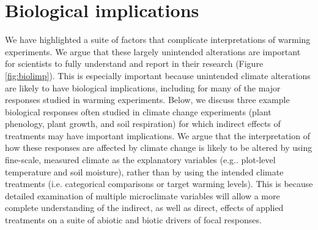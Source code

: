 \documentclass{article}
\begin{document}
\section* {Biological implications}
\par We have highlighted a suite of factors that complicate interpretations of warming experiments. We argue that these largely unintended alterations are important for scientists to fully understand and report in their research (Figure \ref{fig:biolimp}). This is especially important because unintended climate alterations are likely to have biological implications, including for many of the major responses studied in warming experiments. Below, we discuss three example biological responses often studied in climate change experiments (plant phenology, plant growth, and soil respiration) for which indirect effects of treatments may have important implications. We argue that the interpretation of how these responses are affected by climate change is likely to be altered by using fine-scale, measured climate as the explanatory variables (e.g.. plot-level temperature and soil moisture), rather than by using the intended climate treatments (i.e. categorical comparisons or target warming levels). This is because detailed examination of multiple microclimate variables will allow a more complete understanding of the indirect, as well as direct, effects of applied treatments on a suite of abiotic and biotic drivers of focal responses.
\end{document}
